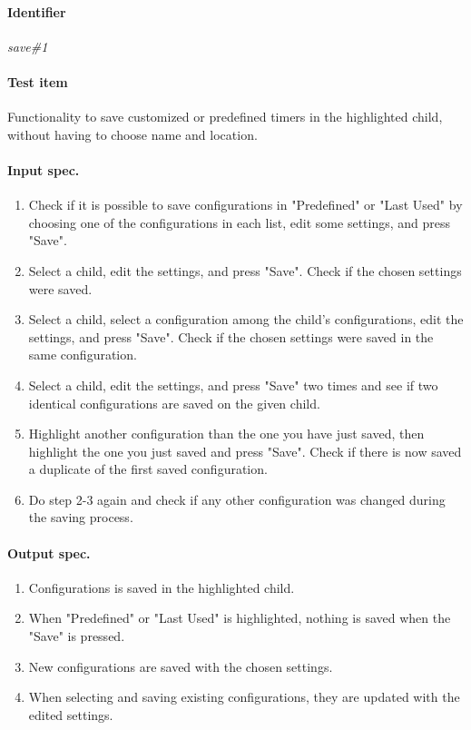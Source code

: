 \clearpage
\paragraph{Identifier}
	\textit{save\#1}
\paragraph{Test item}
	Functionality to save customized or predefined timers in the highlighted child, without having to choose name and location.
\paragraph{Input spec.}
	\begin{enumerate}
		\item Check if it is possible to save configurations in "Predefined" or "Last Used" by choosing one of the configurations in each list, edit some settings, and press "Save".
		\item Select a child, edit the settings, and press "Save". Check if the chosen settings were saved.
		\item Select a child, select a configuration among the child's configurations, edit the settings, and press "Save". Check if the chosen settings were saved in the same configuration.
		\item Select a child, edit the settings, and press "Save" two times and see if two identical configurations are saved on the given child.
		\item Highlight another configuration than the one you have just saved, then highlight the one you just saved and press "Save". Check if there is now saved a duplicate of the first saved configuration.
		\item Do step 2-3 again and check if any other configuration was changed during the saving process.
	\end{enumerate}
\paragraph{Output spec.}
	\begin{enumerate}
		\item Configurations is saved in the highlighted child.
		\item When "Predefined" or "Last Used" is highlighted, nothing is saved when the "Save" is pressed.
		\item New configurations are saved with the chosen settings.
		\item When selecting and saving existing configurations, they are updated with the edited settings.
	\end{enumerate}
